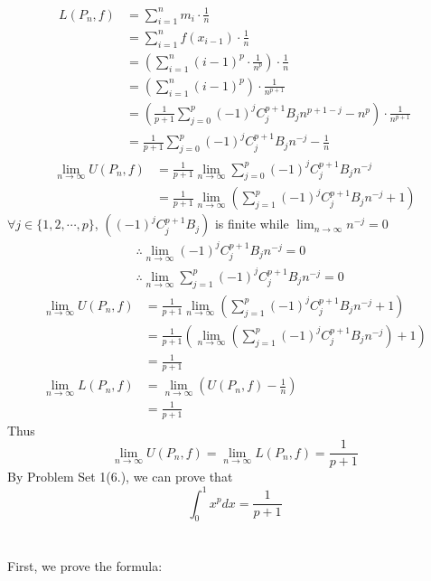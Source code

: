 \documentclass{article}
\def\to{\rightarrow}
\begin{document}
\begin{align*}
L(P_n,f)&=\sum_{i=1}^{n}m_i\cdot \frac{1}{n}\\
&=\sum_{i=1}^{n}f(x_{i-1})\cdot\frac{1}{n}\\
&=\left(\sum_{i=1}^{n}(i-1)^p\cdot\frac{1}{n^p}\right)\cdot\frac{1}{n}\\
&=\left(\sum_{i=1}^{n}(i-1)^p\right)\cdot\frac{1}{n^{p+1}}\\
&=\left(\frac{1}{p+1}\sum_{j=0}^{p}(-1)^j C^{p+1}_j B_jn^{p+1-j}-n^p\right)\cdot\frac{1}{n^{p+1}}\\
&=\frac{1}{p+1}\sum_{j=0}^{p}(-1)^j C^{p+1}_j B_jn^{-j}-\frac{1}{n}
\end{align*}
\begin{align*}
  \lim_{n\to\infty}U(P_n,f)&=\frac{1}{p+1}\lim_{n\to\infty}
  \sum_{j=0}^{p}(-1)^j C^{p+1}_j B_jn^{-j}\\
  &=\frac{1}{p+1}\lim_{n\to\infty}
  \left(\sum_{j=1}^{p}(-1)^j C^{p+1}_j B_jn^{-j}+1\right)
\end{align*}
$\forall j\in\{1,2,\cdots,p\}$, $\left((-1)^j C^{p+1}_j B_j\right)$ is finite while
$\lim_{n\to\infty}n^{-j}=0$
$$\begin{aligned}
&\therefore \lim_{n\to\infty}(-1)^j C^{p+1}_j B_jn^{-j}=0 \\
&\therefore \lim_{n\to\infty}\sum_{j=1}^{p}(-1)^j C^{p+1}_j B_jn^{-j}=0
\end{aligned}$$
\begin{align*}
  \lim_{n\to\infty}U(P_n,f)&=\frac{1}{p+1}\lim_{n\to\infty}
  \left(\sum_{j=1}^{p}(-1)^j C^{p+1}_j B_jn^{-j}+1\right)\\
  &=\frac{1}{p+1}\left(\lim_{n\to\infty}
  \left(\sum_{j=1}^{p}(-1)^j C^{p+1}_j B_jn^{-j}\right)+1\right)\\
  &=\frac{1}{p+1}\\
  \lim_{n\to\infty}L(P_{n},f)&=\lim_{n\to\infty}\left(U(P_n,f)-\frac{1}{n}\right)\\
  &=\frac{1}{p+1}
\end{align*}
Thus
$$\lim_{n\to\infty}U(P_{n},f)=\lim_{n\to\infty}L(P_{n},f)=\frac{1}{p+1}$$
By Problem Set 1(6.), we can prove that 
$$\int_{0}^{1}x^p dx=\frac{1}{p+1}$$

\section{} %
First, we prove the formula:
\end{document}
